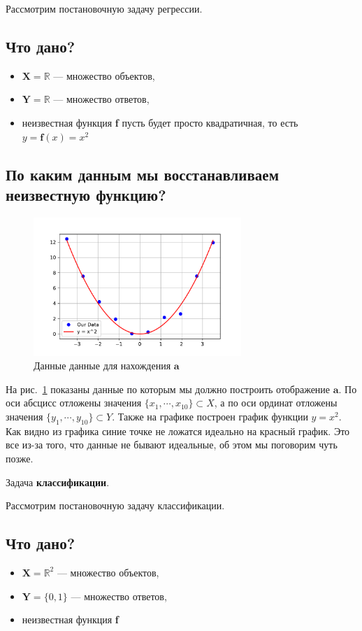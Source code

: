 \documentclass[12pt, twoside]{article}
\begin{document}
Рассмотрим постановочную задачу регрессии.
\subsection{Что дано?}
\begin{itemize}
	\item $\textbf{X} = \mathbb{R}$ --- множество объектов,
	\item $\textbf{Y} = \mathbb{R}$ --- множество ответов,
	\item неизвестная функция \textbf{f} пусть будет просто квадратичная, то есть $y = \textbf{f}(x) = x^2$ 
\end{itemize}

\subsection{По каким данным мы восстанавливаем неизвестную функцию?}
\begin{figure}[h!t]\center
\includegraphics[width=0.7\textwidth]{Lecture_2_regress.pdf}
\caption{Данные данные для нахождения $\textbf{a}$}
\label{Lecture_2_regress}
\end{figure}

На рис.~\ref{Lecture_2_regress} показаны данные по которым мы должно построить отображение $\textbf{a}$. По оси абсцисс отложены значения $\{x_1, \cdots, x_{10}\} \subset X$, а по оси ординат отложены значения $\{y_1, \cdots, y_{10}\} \subset Y$. Также на графике построен график функции $y = x^2$. Как видно из графика синие точке не ложатся идеально на красный график. Это все из-за того, что данные не бывают идеальные, об этом мы поговорим чуть позже.

  \begin{center}
Задача {\bf классификации}.
 \end{center}
 
 Рассмотрим постановочную задачу классификации.
\subsection{Что дано?}
\begin{itemize}
	\item $\textbf{X} = \mathbb{R}^2$ --- множество объектов,
	\item $\textbf{Y} = \{0,1\}$ --- множество ответов,
	\item неизвестная функция \textbf{f} 
\end{itemize}
\end{document}
